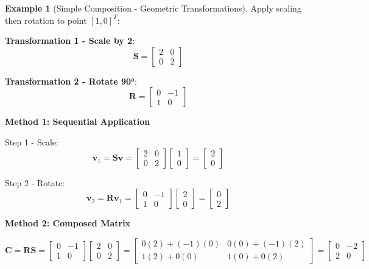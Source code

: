 \documentclass[12pt,a4paper]{article}
\theoremstyle{definition}
\newtheorem{example}{Example}[section]
\begin{document}
\begin{example}[Simple Composition - Geometric Transformations]
Apply scaling then rotation to point $[1, 0]^T$:

\textbf{Transformation 1 - Scale by 2}:
\[
\mathbf{S} = \begin{bmatrix}
2 & 0 \\
0 & 2
\end{bmatrix}
\]

\textbf{Transformation 2 - Rotate 90°}:
\[
\mathbf{R} = \begin{bmatrix}
0 & -1 \\
1 & 0
\end{bmatrix}
\]

\textbf{Method 1: Sequential Application}

Step 1 - Scale:
\[
\mathbf{v}_1 = \mathbf{S}\mathbf{v} = \begin{bmatrix}
2 & 0 \\
0 & 2
\end{bmatrix}
\begin{bmatrix}
1 \\ 0
\end{bmatrix}
= \begin{bmatrix}
2 \\ 0
\end{bmatrix}
\]

Step 2 - Rotate:
\[
\mathbf{v}_2 = \mathbf{R}\mathbf{v}_1 = \begin{bmatrix}
0 & -1 \\
1 & 0
\end{bmatrix}
\begin{bmatrix}
2 \\ 0
\end{bmatrix}
= \begin{bmatrix}
0 \\ 2
\end{bmatrix}
\]

\textbf{Method 2: Composed Matrix}

\[
\mathbf{C} = \mathbf{R}\mathbf{S} = \begin{bmatrix}
0 & -1 \\
1 & 0
\end{bmatrix}
\begin{bmatrix}
2 & 0 \\
0 & 2
\end{bmatrix}
= \begin{bmatrix}
0(2) + (-1)(0) & 0(0) + (-1)(2) \\
1(2) + 0(0) & 1(0) + 0(2)
\end{bmatrix}
= \begin{bmatrix}
0 & -2 \\
2 & 0
\end{bmatrix}
\]


\end{example}
\end{document}

